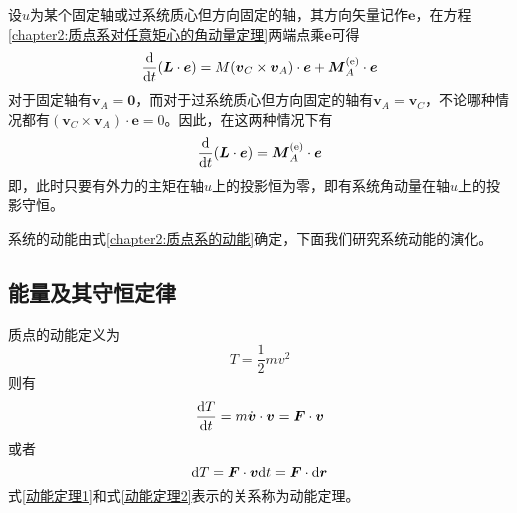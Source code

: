 设$u$为某个固定轴或过系统质心但方向固定的轴，其方向矢量记作$\boldsymbol{e}$，在方程\eqref{chapter2:质点系对任意矩心的角动量定理}两端点乘$\boldsymbol{e}$可得
\begin{equation}
	\frac{\mathrm{d}}{\mathrm{d} t}(\boldsymbol{L}\cdot \boldsymbol{e}) = M (\boldsymbol{v}_C\times \boldsymbol{v}_A) \cdot \boldsymbol{e} + \boldsymbol{M}_A^{(\mathrm{e})}\cdot \boldsymbol{e}
\end{equation}
对于固定轴有$\boldsymbol{v}_A=\boldsymbol{0}$，而对于过系统质心但方向固定的轴有$\boldsymbol{v}_A=\boldsymbol{v}_C$，不论哪种情况都有$(\boldsymbol{v}_C\times \boldsymbol{v}_A) \cdot \boldsymbol{e} = 0$。因此，在这两种情况下有
\begin{equation}
	\frac{\mathrm{d}}{\mathrm{d} t}(\boldsymbol{L}\cdot \boldsymbol{e}) = \boldsymbol{M}_A^{(\mathrm{e})}\cdot \boldsymbol{e}
\end{equation}
即，此时只要有外力的主矩在轴$u$上的投影恒为零，即有系统角动量在轴$u$上的投影守恒。

系统的动能由式\eqref{chapter2:质点系的动能}确定，下面我们研究系统动能的演化。

\subsection{能量及其守恒定律}

质点的{\heiti 动能}定义为
\begin{equation}
	T = \frac12 mv^2
\end{equation}
则有
\begin{equation}
	\frac{\mathrm{d} T}{\mathrm{d} t} = m\dot{\boldsymbol{v}} \cdot \boldsymbol{v} = \boldsymbol{F} \cdot \boldsymbol{v}
	\label{动能定理1}
\end{equation}
或者
\begin{equation}
	\mathrm{d}T = \boldsymbol{F} \cdot \boldsymbol{v}\mathrm{d} t = \boldsymbol{F} \cdot \mathrm{d} \boldsymbol{r}
	\label{动能定理2}
\end{equation}
式\eqref{动能定理1}和式\eqref{动能定理2}表示的关系称为{\heiti 动能定理}。

